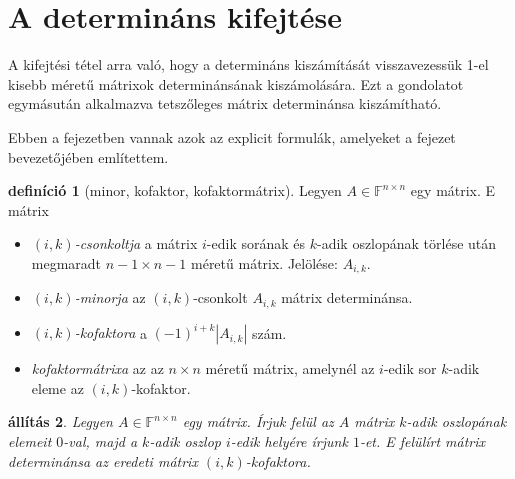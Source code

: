 \documentclass[a4paper, showtrims]{memoir}
\theoremstyle{plain}
\newtheorem{proposition}{állítás}[chapter]
\theoremstyle{remark}
\theoremstyle{definition}
\newtheorem{definition}[proposition]{definíció}
\begin{document}
\section{A determináns kifejtése}
A kifejtési tétel arra való,
hogy a determináns kiszámítását visszavezessük 1-el kisebb méretű mátrixok determinánsának kiszámolására.
Ezt a gondolatot egymásután alkalmazva tetszőleges mátrix determinánsa kiszámítható.

Ebben a fejezetben vannak azok az explicit formulák,
amelyeket a fejezet bevezetőjében említettem.
\begin{definition}[minor, kofaktor, kofaktormátrix]
	Legyen $A\in\mathbb{F}^{n\times n}$ egy mátrix.
	E mátrix
	\begin{itemize}
		\item\emph{$\left( i,k \right)$-csonkoltja}
		      a mátrix $i$-edik sorának és $k$-adik oszlopának törlése után megmaradt
		      $n-1\times n-1$ méretű mátrix. Jelölése: $A_{i,k}$.
		\item\emph{$\left( i,k \right)$-minorja}
		      az $(i,k)$-csonkolt $A_{i,k}$ mátrix determinánsa.
		\item\emph{$\left( i,k \right)$-kofaktora}
		      a $\left( -1 \right)^{i+k}|A_{i,k}|$ szám.
		\item\emph{kofaktormátrixa}
		      az az $n\times n$ méretű mátrix,
		      amelynél az $i$-edik sor $k$-adik eleme az $\left( i,k \right)$-kofaktor.\qedhere
	\end{itemize}
\end{definition}
\begin{proposition}
	Legyen $A\in\mathbb{F}^{n\times n}$ egy mátrix.
	Írjuk felül az $A$ mátrix $k$-adik oszlopának elemeit $0$-val,
	majd a $k$-adik oszlop $i$-edik helyére írjunk $1$-et.
	E felülírt mátrix determinánsa az eredeti mátrix $\left( i,k \right)$-kofaktora.
\end{proposition}
\end{document}
